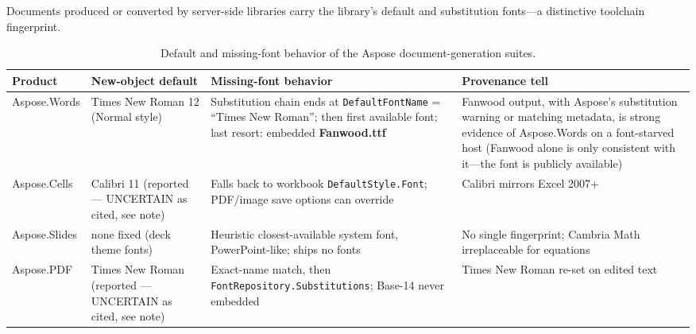 \documentclass[10pt,a4paper]{article}
\newcommand{\code}[1]{\texttt{#1}}
\begin{document}
Documents produced or converted by server-side libraries carry the library's default
and substitution fonts---a distinctive toolchain fingerprint.

\begin{table}[t]
\centering\small
\caption{Default and missing-font behavior of the Aspose document-generation suites.}
\label{tab:aspose}
\renewcommand{\arraystretch}{1.25}
\begin{tabular}{@{}>{\raggedright\arraybackslash}p{} >{\raggedright\arraybackslash}p{} >{\raggedright\arraybackslash}p{} >{\raggedright\arraybackslash}p{}@{}}
\toprule
Product & New-object default & Missing-font behavior & Provenance tell \\
\midrule
Aspose.Words & Times New Roman 12 (Normal style) & Substitution chain ends at \code{DefaultFontName} = ``Times New Roman''; then first available font; last resort: embedded \textbf{Fanwood.ttf} & Fanwood output, with Aspose's substitution warning or matching metadata, is strong evidence of Aspose.Words on a font-starved host (Fanwood alone is only consistent with it---the font is publicly available) \\
\addlinespace
Aspose.Cells & Calibri 11 (reported --- UNCERTAIN as cited, see note) & Falls back to workbook \code{DefaultStyle.Font}; PDF/image save options can override & Calibri mirrors Excel 2007+ \\
\addlinespace
Aspose.Slides & none fixed (deck theme fonts) & Heuristic closest-available system font, PowerPoint-like; ships no fonts & No single fingerprint; Cambria Math irreplaceable for equations \\
\addlinespace
Aspose.PDF & Times New Roman (reported --- UNCERTAIN as cited, see note) & Exact-name match, then \code{FontRepository.Substitutions}; Base-14 never embedded & Times New Roman re-set on edited text \\
\bottomrule
\end{tabular}
\end{table}
\end{document}
